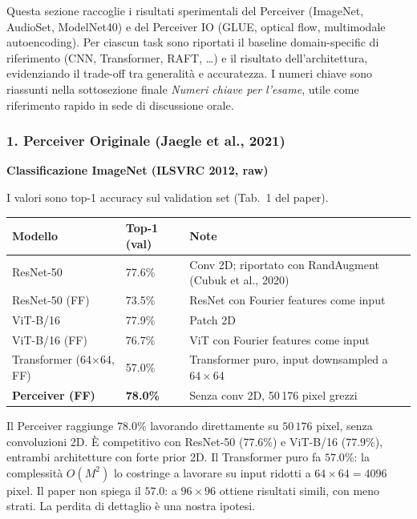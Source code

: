 \documentclass[
  11pt,
]{article}
\begin{document}
Questa sezione raccoglie i risultati sperimentali del Perceiver (ImageNet, AudioSet, ModelNet40) e del Perceiver IO (GLUE, optical flow, multimodale autoencoding). Per ciascun task sono riportati il baseline domain-specific di riferimento (CNN, Transformer, RAFT, \ldots) e il risultato dell'architettura, evidenziando il trade-off tra generalità e accuratezza. I numeri chiave sono riassunti nella sottosezione finale \emph{Numeri chiave per l'esame}, utile come riferimento rapido in sede di discussione orale.

\subsubsection*{1. Perceiver Originale (Jaegle et al., 2021)}

\textbf{Classificazione ImageNet (ILSVRC 2012, raw)}

I valori sono top-1 accuracy sul validation set (Tab.\ 1 del paper).

{\small
\begin{longtable}{@{}p{5.5cm} p{2.5cm} p{5cm}@{}}
\toprule
\textbf{Modello} & \textbf{Top-1 (val)} & \textbf{Note} \\
\midrule
\endhead
ResNet-50 & 77.6\% & Conv 2D; riportato con RandAugment (Cubuk et al., 2020) \\[2pt]
ResNet-50 (FF) & 73.5\% & ResNet con Fourier features come input \\[2pt]
ViT-B/16 & 77.9\% & Patch 2D \\[2pt]
ViT-B/16 (FF) & 76.7\% & ViT con Fourier features come input \\[2pt]
Transformer (64$\times$64, FF) & 57.0\% & Transformer puro, input downsampled a $64\times64$ \\[2pt]
\textbf{Perceiver (FF)} & \textbf{78.0\%} & Senza conv 2D, 50\,176 pixel grezzi \\
\bottomrule
\end{longtable}
}

\begin{notabox}[title={\textbf{Perceiver su ImageNet raw}}]
Il Perceiver raggiunge $78.0\%$ lavorando direttamente su $50\,176$ pixel, senza convoluzioni 2D. È competitivo con ResNet-50 ($77.6\%$) e ViT-B/16 ($77.9\%$), entrambi architetture con forte prior 2D. Il Transformer puro fa $57.0\%$: la complessità $O(M^2)$ lo costringe a lavorare su input ridotti a $64\times64 = 4096$ pixel. Il paper non spiega il $57.0$: a $96\times96$ ottiene risultati simili, con meno strati. La perdita di dettaglio è una nostra ipotesi.
\end{notabox}
\end{document}
